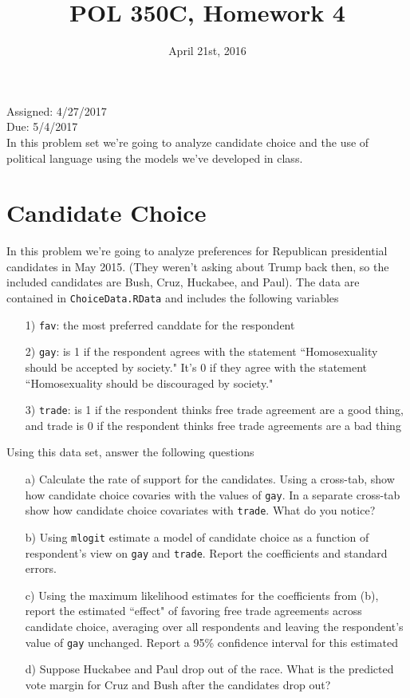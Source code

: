 \documentclass[letterpaper,12pt]{article}
\title{POL 350C, Homework 4}
\date{April 21st, 2016}
\numberwithin{equation}{section}
\numberwithin{equation}{section}
\begin{document}
\maketitle

\noindent Assigned: 4/27/2017\\
Due: 5/4/2017\\

In this problem set we're going to analyze candidate choice and the use of political language using the models we've developed in class.

\section{Candidate Choice}
In this problem we're going to analyze preferences for Republican presidential candidates in May 2015. (They weren't asking about Trump back then, so the included candidates are Bush, Cruz, Huckabee, and Paul).  The data are contained in {\tt ChoiceData.RData} and includes the following variables

\begin{itemize}
\item[1)] {\tt fav}: the most preferred canddate for the respondent
\item[2)] {\tt gay}: is 1 if the respondent agrees with the statement ``Homosexuality should be accepted by society." It's 0 if they agree with the statement ``Homosexuality should be discouraged by society."
\item[3)] {\tt trade}: is 1 if the respondent thinks free trade agreement are a good thing, and trade is 0 if the respondent thinks free trade agreements are a bad thing
\end{itemize}

Using this data set, answer the following questions
\begin{itemize}
\item[a)] Calculate the rate of support for the candidates.  Using a cross-tab, show how candidate choice covaries with the values of {\tt gay}. In a separate cross-tab show how candidate choice covariates with  {\tt trade}.  What do you notice?
\item[b)] Using {\tt mlogit} estimate a model of candidate choice as a function of respondent's view on {\tt gay} and {\tt trade}.  Report the coefficients and standard errors.
\item[c)] Using the maximum likelihood estimates for the coefficients from (b), report the estimated ``effect" of favoring free trade agreements across candidate choice, averaging over all respondents and leaving the respondent's value of {\tt gay} unchanged.  Report a 95\% confidence interval for this estimated
\item[d)] Suppose Huckabee and Paul drop out of the race.  What is the predicted vote margin for Cruz and Bush after the candidates drop out?
\end{itemize}
\end{document}
